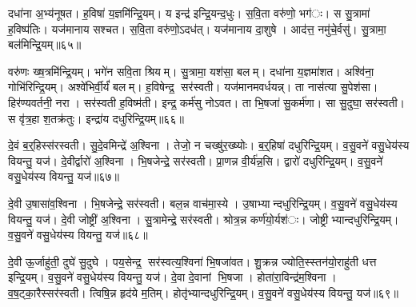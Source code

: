 दधा॑ना अ॒भ्य॑नूषत। ह॒विषा॑ य॒ज्ञमि॑न्द्रि॒यम्। य इन्द्र॑ इन्द्रि॒यन्द॒धुः। स॒वि॒ता वरु॑णो॒ भग॑ः। स सु॒त्रामा॑ ह॒विष्प॑तिः। यज॑मानाय सश्चत। स॒वि॒ता वरु॑णो॒ऽदध॑त्। यज॑मानाय दा॒शुषे। आद॑त्त॒ नमु॑चे॒र्वसु॑। सु॒त्रामा॒ बल॑मिन्द्रि॒यम्॥६५॥

वरु॑णः ख्ष॒त्रमि॑न्द्रि॒यम्। भगे॑न सवि॒ता श्रियम्। सु॒त्रामा॒ यश॑सा॒ बलम्। दधा॑ना य॒ज्ञमा॑शत। अश्वि॑ना॒ गोभि॑रिन्द्रि॒यम्। अश्वे॑भिर्वी॒र्यं॑ बलम्। ह॒विषेन्द्र॒ सर॑स्वती। यज॑मानमवर्धयन्न्। ता नास॑त्या सु॒पेश॑सा। हिर॑ण्यवर्तनी॒ नरा। सर॑स्वती ह॒विष्म॑ती। इन्द्र॒ कर्म॑सु नोऽवत। ता भि॒षजा॑ सु॒कर्म॑णा। सा सु॒दुघा॒ सर॑स्वती। स वृ॑त्र॒हा श॒तक्र॑तुः। इन्द्रा॑य दधुरिन्द्रि॒यम्॥६६॥


दे॒वं ब॒र्॒हिस्स॑रस्वती। सु॒दे॒वमिन्द्रे॑ अ॒श्विना। तेजो॒ न चख्षु॑र॒ख्ष्योः। ब॒र्॒हिषा॑ दधुरिन्द्रि॒यम्। व॒सु॒वने॑ वसु॒धेय॑स्य वियन्तु॒ यज॑। दे॒वीर्द्वारो॑ अ॒श्विना। भि॒षजेन्द्रे॒ सर॑स्वती। प्रा॒णन्न वी॒र्य॑न्न॒सि। द्वारो॑ दधुरिन्द्रि॒यम्। व॒सु॒वने॑ वसु॒धेय॑स्य वियन्तु॒ यज॑॥६७॥

दे॒वी उ॒षासा॑व॒श्विना। भि॒षजेन्द्रे॒ सर॑स्वती। बल॒न्न वाच॑मा॒स्ये। उ॒षाभ्यान्दधुरिन्द्रि॒यम्। व॒सु॒वने॑ वसु॒धेय॑स्य वियन्तु॒ यज॑। दे॒वी जोष्ट्री॑ अ॒श्विना। सु॒त्रामेन्द्रे॒ सर॑स्वती। श्रोत्र॒न्न कर्ण॑यो॒र्यश॑ः। जोष्ट्रीभ्यान्दधुरिन्द्रि॒यम्। व॒सु॒वने॑ वसु॒धेय॑स्य वियन्तु॒ यज॑॥६८॥

दे॒वी ऊ॒र्जाहु॑ती॒ दुघे॑ सु॒दुघे। पय॒सेन्द्र॒ सर॑स्वत्य॒श्विना॑ भि॒षजा॑वत। शु॒क्रन्न ज्योति॒स्स्तन॑यो॒राहु॑ती धत्त इन्द्रि॒यम्। व॒सु॒वने॑ वसु॒धेय॑स्य वियन्तु॒ यज॑। दे॒वा दे॒वानां भि॒षजा। होता॑रा॒विन्द्र॑म॒श्विना। व॒ष॒ट्का॒रैस्सर॑स्वती। त्विषि॒न्न हृद॑ये म॒तिम्। होतृ॑भ्यान्दधुरिन्द्रि॒यम्। व॒सु॒वने॑ वसु॒धेय॑स्य वियन्तु॒ यज॑॥६९॥

